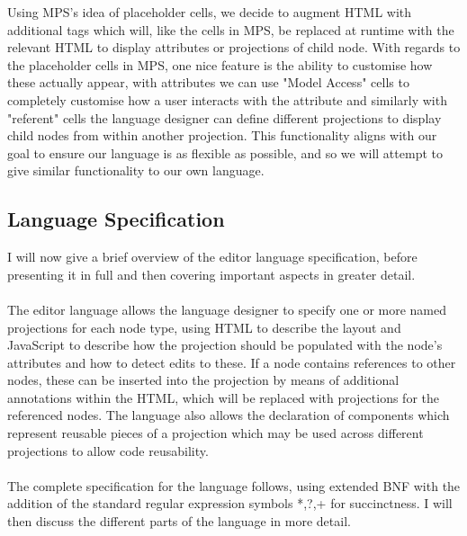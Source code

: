 \documentclass{article}
\begin{document}
Using MPS's idea of placeholder cells, we decide to augment HTML with additional tags which will, like the cells in MPS, be replaced at runtime with the relevant HTML to display attributes or projections of child node. With regards to the placeholder cells in MPS, one nice feature is the ability to customise how these actually appear, with attributes we can use "Model Access" cells to completely customise how a user interacts with the attribute and similarly with "referent" cells the language designer can define different projections to display child nodes from within another projection. This functionality aligns with our goal to ensure our language is as flexible as possible, and so we will attempt to give similar functionality to our own language.

\subsection{Language Specification}
I will now give a brief overview of the editor language specification, before presenting it in full and then covering important aspects in greater detail. 
\\
\\
The editor language allows the language designer to specify one or more named projections for each node type, using HTML to describe the layout and JavaScript to describe how the projection should be populated with the node's attributes and how to detect edits to these. If a node contains references to other nodes, these can be inserted into the projection by means of additional annotations within the HTML, which will be replaced with projections for the referenced nodes. The language also allows the declaration of components which represent reusable pieces of a projection which may be used across different projections to allow code reusability. 
\\
\\
The complete specification for the language follows, using extended BNF with the addition of the standard regular expression symbols *,?,+ for succinctness. I will then discuss the different parts of the language in more detail.

\setlength{\grammarparsep}{12pt plus 1pt minus 1pt} %
\setlength{\grammarindent}{5em} %
\end{document}
